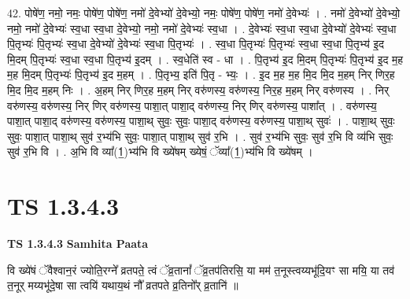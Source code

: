\documentclass[17pt]{extarticle}
\begin{document}
42. पोषे॑ण॒ नमो॒ नमः॒ पोषे॑ण॒ पोषे॑ण॒ नमो॑ दे॒वेभ्यो॑ दे॒वेभ्यो॒ नमः॒ पोषे॑ण॒ पोषे॑ण॒ नमो॑ दे॒वेभ्यः॑ । . नमो॑ दे॒वेभ्यो॑ दे॒वेभ्यो॒ नमो॒ नमो॑ दे॒वेभ्यः॑ स्व॒धा स्व॒धा दे॒वेभ्यो॒ नमो॒ नमो॑ दे॒वेभ्यः॑ स्व॒धा । . दे॒वेभ्यः॑ स्व॒धा स्व॒धा दे॒वेभ्यो॑ दे॒वेभ्यः॑ स्व॒धा पि॒तृभ्यः॑ पि॒तृभ्यः॑ स्व॒धा दे॒वेभ्यो॑ दे॒वेभ्यः॑ स्व॒धा पि॒तृभ्यः॑ । . स्व॒धा पि॒तृभ्यः॑ पि॒तृभ्यः॑ स्व॒धा स्व॒धा पि॒तृभ्य॑ इ॒द मि॒दम् पि॒तृभ्यः॑ स्व॒धा स्व॒धा पि॒तृभ्य॑ इ॒दम् । . स्व॒धेति॑ स्व - धा । . पि॒तृभ्य॑ इ॒द मि॒दम् पि॒तृभ्यः॑ पि॒तृभ्य॑ इ॒द म॒ह म॒ह मि॒दम् पि॒तृभ्यः॑ पि॒तृभ्य॑ इ॒द म॒हम् । . पि॒तृभ्य॒ इति॑ पि॒तृ - भ्यः॒ । . इ॒द म॒ह म॒ह मि॒द मि॒द म॒हम् निर् णिर॒ह मि॒द मि॒द म॒हम् निः । . अ॒हम् निर् णिर॒ह म॒हम् निर् वरु॑णस्य॒ वरु॑णस्य॒ निर॒ह म॒हम् निर् वरु॑णस्य । . निर् वरु॑णस्य॒ वरु॑णस्य॒ निर् णिर् वरु॑णस्य॒ पाशा॒त् पाशा॒द् वरु॑णस्य॒ निर् णिर् वरु॑णस्य॒ पाशा᳚त् । . वरु॑णस्य॒ पाशा॒त् पाशा॒द् वरु॑णस्य॒ वरु॑णस्य॒ पाशा॒थ् सुवः॒ सुवः॒ पाशा॒द् वरु॑णस्य॒ वरु॑णस्य॒ पाशा॒थ् सुवः॑ । . पाशा॒थ् सुवः॒ सुवः॒ पाशा॒त् पाशा॒थ् सुव॑ र॒भ्य॑भि सुवः॒ पाशा॒त् पाशा॒थ् सुव॑ र॒भि । . सुव॑ र॒भ्य॑भि सुवः॒ सुव॑ र॒भि वि व्य॑भि सुवः॒ सुव॑ र॒भि वि । . अ॒भि वि व्या᳚(1॒)भ्य॑भि वि ख्ये॑षम् ख्येषं॒ ॅव्या᳚(1॒)भ्य॑भि वि ख्ये॑षम् । \newline
\pagebreak
{}
\section*{ TS 1.3.4.3 }

\textbf{TS 1.3.4.3 } \newline
\textbf{Samhita Paata} \newline

वि ख्ये॑षं ॅवैश्वान॒रं ज्योति॒रग्ने᳚ व्रतपते॒ त्वं ॅव्र॒तानां᳚ ॅव्र॒तप॑तिरसि॒ या मम॑ त॒नूस्त्वय्यभू॑दि॒यꣳ सा मयि॒ या तव॑ त॒नूर् मय्यभू॑दे॒षा सा त्वयि॑ यथाय॒थं नौ᳚ व्रतपते व्र॒तिनो᳚र् व्र॒तानि॑ ॥ \newline
\end{document}
